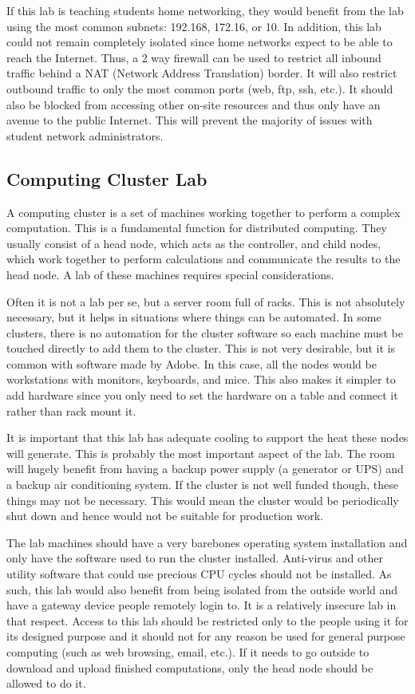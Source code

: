If this lab is teaching students home networking, they would benefit from the lab using the most common subnets:  192.168, 172.16, or 10.  In addition, this lab could not remain completely isolated since home networks expect to be able to reach the Internet.  Thus, a 2 way firewall can be used to restrict all inbound traffic behind a NAT (Network Address Translation) border.  It will also restrict outbound traffic to only the most common ports (web, ftp, ssh, etc.).  It should also be blocked from accessing other on-site resources and thus only have an avenue to the public Internet.  This will prevent the majority of issues with student network administrators.   
\subsection{Computing Cluster Lab}
A computing cluster is a set of machines working together to perform a complex computation.  This is a fundamental function for distributed computing.  They usually consist of a head node, which acts as the controller, and child nodes, which work together to perform calculations and communicate the results to the head node.  A lab of these machines requires special considerations.  

Often it is not a lab per se, but a server room full of racks.  This is not absolutely necessary, but it helps in situations where things can be automated.  In some clusters, there is no automation for the cluster software so each machine must be touched directly to add them to the cluster.  This is not very desirable, but it is common with software made by Adobe.  In this case, all the nodes would be workstations with monitors, keyboards, and mice.  This also makes it simpler to add hardware since you only need to set the hardware on a table and connect it rather than rack mount it.  

It is important that this lab has adequate cooling to support the heat these nodes will generate.  This is probably the most important aspect of the lab.  The room will hugely benefit from having a backup power supply (a generator or UPS) and a backup air conditioning system.  If the cluster is not well funded though, these things may not be necessary.  This would mean the cluster would be periodically shut down and hence would not be suitable for production work.  

The lab machines should have a very barebones operating system installation and only have the software used to run the cluster installed.  Anti-virus and other utility software that could use precious CPU cycles should not be installed.  As such, this lab would also benefit from being isolated from the outside world and have a gateway device people remotely login to.  It is a relatively insecure lab in that respect.  Access to this lab should be restricted only to the people using it for its designed purpose and it should not for any reason be used for general purpose computing (such as web browsing, email, etc.).  If it needs to go outside to download and upload finished computations, only the head node should be allowed to do it.  

